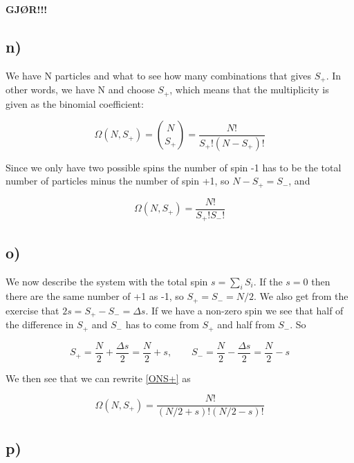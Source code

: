 \documentclass[a4paper,norsk, 10pt]{article}
\begin{document}
\textbf{GJØR!!!}

\subsection{n)}
We have N particles and what to see how many combinations that gives $S_+$. In other words, we have N and choose $S_+$, which means that the multiplicity is given as the binomial coefficient:

\begin{equation}
\Omega(N,S_+) = \binom{N}{S_+} = \frac{N!}{S_+!(N-S_+)!}
\end{equation}

Since we only have two possible spins the number of spin -1 has to be the total number of particles minus the number of spin +1, so $N-S_+ = S_-$, and

\begin{equation}
\Omega(N,S_+) = \frac{N!}{S_+!S_-!}
\end{equation}\label{ONS+}

\subsection{o)}

We now describe the system with the total spin $s = \sum_i S_i$. If the $s=0$ then there are the same number of +1 as -1, so $S_+ = S_- = N/2$. We also get from the exercise that $2s = S_+ - S_- = \Delta s$. If we have a non-zero spin we see that half of the difference in $S_+$ and $S_-$ has to come from $S_+$ and half from $S_-$. So

\begin{equation}
S_+ = \frac{N}{2} + \frac{\Delta s}{2} = \frac{N}{2} + s, \qquad S_- = \frac{N}{2} - \frac{\Delta s}{2} = \frac{N}{2} - s 
\end{equation}

We then see that we can rewrite \eqref{ONS+} as

\begin{equation}
\Omega(N,S_+) = \frac{N!}{(N/2 + s)!(N/2-s)!}
\end{equation}

\subsection{p)}
\end{document}
